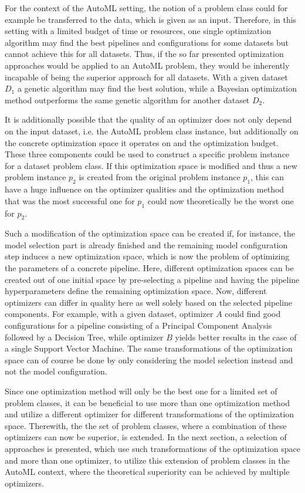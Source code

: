 For the context of the AutoML setting, the notion of a problem class could for example be transferred to the data, which is given as an input.
Therefore, in this setting with a limited budget of time or resources, one single optimization algorithm may find the best pipelines and configurations for some datasets but cannot achieve this for all datasets.
Thus, if the so far presented optimization approaches would be applied to an AutoML problem, they would be inherently incapable of being the superior approach for all datasets.
With a given dataset $D_1$ a genetic algorithm may find the best solution, while a Bayesian optimization method outperforms the same genetic algorithm for another dataset $D_2$.

It is additionally possible that the quality of an optimizer does not only depend on the input dataset, i.e. the AutoML problem class instance, but additionally on the concrete optimization space it operates on and the optimization budget.
These three components could be used to construct a specific problem instance for a dataset problem class.\newline
If this optimization space is modified and thus a new problem instance $p_2$ is created from the original problem instance $p_1$, this can have a huge influence on the optimizer qualities and the optimization method that was the most successful one for $p_1$ could now theoretically be the worst one for $p_2$.

Such a modification of the optimization space can be created if, for instance, the model selection part is already finished and the remaining model configuration step induces a new optimization space, which is now the problem of optimizing the parameters of a concrete pipeline.
Here, different optimization spaces can be created out of one initial space by pre-selecting a pipeline and having the pipeline hyperparameters define the remaining optimization space.\newline
Now, different optimizers can differ in quality here as well solely based on the selected pipeline components.
For example, with a given dataset, optimizer $A$ could find good configurations for a pipeline consisting of a Principal Component Analysis followed by a Decision Tree, while optimizer $B$ yields better results in the case of a single Support Vector Machine.
The same transformations of the optimization space can of course be done by only considering the model selection instead and not the model configuration.

Since one optimization method will only be the best one for a limited set of problem classes, it can be beneficial to use more than one optimization method and utilize a different optimizer for different transformations of the optimization space.
Therewith, the the set of problem classes, where a combination of these optimizers can now be superior, is extended.\newline
In the next section, a selection of approaches is presented, which use such transformations of the optimization space and more than one optimizer, to utilize this extension of problem classes in the AutoML context, where the theoretical superiority can be achieved by multiple optimizers.

